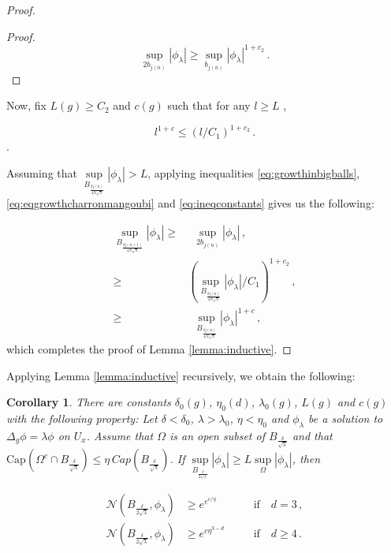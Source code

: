 \documentclass{amsart}
\newtheorem{corollary}[theorem]{Corollary}
\begin{document}
\begin{proof}
\begin{proof}
\begin{equation}
\sup\limits_{2b_{j(n)}}|\phi_\lambda| \geq \sup\limits_{b_{j(n)}}|\phi_\lambda|^{1+c_2} \, .
\end{equation}


\end{proof}

Now,  fix $L(g) \geq C_2$ and $c(g)$ such that for any $l \geq L$ , 

\begin{equation}\label{eq:ineqconstants}
    l^{1+c} \leq (l/C_1)^{1+c_2} \, .
\end{equation}.

Assuming that $\sup\limits_{B_{\frac{\delta j(n)}{4N\sqrt{\lambda}}}} |\phi_{\lambda}|> L$, applying inequalities \eqref{eq:growthinbigballs}, \eqref{eq:eqgrowthcharronmangoubi} and \eqref{eq:ineqconstants} gives us the following:

\begin{align}
    \sup\limits_{B_{\frac{\delta j(n+1)}{4N\sqrt{\lambda}}}} |\phi_{\lambda}| \geq   &\, \, \, \left.\sup\limits_{2 b_{j(n)}} |\phi_{\lambda}|\right.  \, ,\nonumber\\
    \geq &\left(\sup\limits_{B_{\frac{\delta j(n)}{4N\sqrt{\lambda}}}} |\phi_{\lambda}| /C_1\right)^{1+c_2} \, , \nonumber\\
    \geq &\, \, \,\sup\limits_{B_{\frac{\delta j(n)}{4N\sqrt{\lambda}}}} |\phi_{\lambda}|^{1+c} \, ,
\end{align}
which completes the proof of Lemma \ref{lemma:inductive}.




\end{proof}

Applying Lemma \ref{lemma:inductive} recursively, we obtain the following:
\begin{corollary}\label{lemma:growthmaximal}
There are constants $\delta_0(g)$,  $\eta_0(d)$, $\lambda_0(g)$, $L(g)$ and $c(g)$  with the following property:
Let $\delta < \delta_0$, $\lambda > \lambda_0$, $\eta < \eta_0$ and $\phi_{\lambda}$ be a solution to $\Delta_{g} \phi= \lambda \phi$ on $U_{x}$.
Assume that $\Omega$ is an open subset of ${B_{\frac{\delta}{\sqrt{\lambda}}}}$ and that $\text{Cap}(\Omega^c \cap B_{\frac{\delta}{\sqrt{\lambda}}}) \leq \eta \, Cap(B_{\frac{\delta}{\sqrt{\lambda}}})$. If $\sup\limits_{B_{\frac{\delta}{2\sqrt{\lambda}}}} |\phi_{\lambda}| \geq L \sup\limits_\Omega|\phi_{\lambda}|$, then  

\begin{align}
    \mathcal{N}(B_{\frac{\delta}{2\sqrt{\lambda}}},\phi_{\lambda}) &\geq e^{e^{c/\eta}} \quad && \text{if}\quad d=3 \, ,\\
     \mathcal{N}(B_{\frac{\delta}{2\sqrt{\lambda}}},\phi_{\lambda}) &\geq e^{c \eta^{3-d}} \quad && \text{if} \quad d \geq 4 \, .
\end{align}



\end{corollary}
\end{document}
